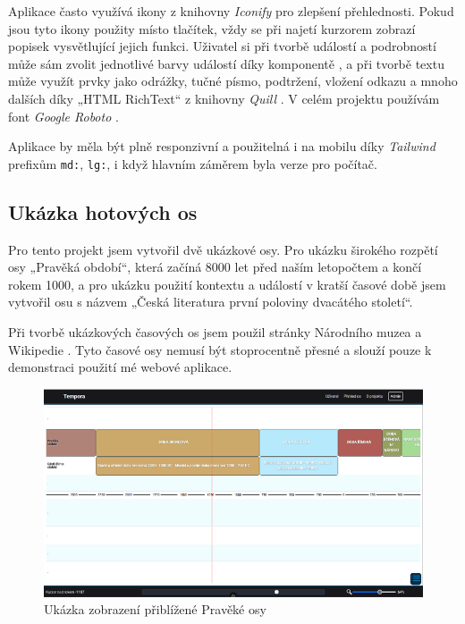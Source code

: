 Aplikace často využívá ikony z knihovny \textit{Iconify} \cite{Icons-pack} pro zlepšení přehlednosti. Pokud jsou tyto ikony použity místo tlačítek, vždy se při najetí kurzorem zobrazí popisek vysvětlující jejich funkci. \newpage Uživatel si při tvorbě událostí a podrobností může sám zvolit jednotlivé barvy událostí díky komponentě \cite{ColorPicker-module}, a při tvorbě textu může využít prvky jako odrážky, tučné písmo, podtržení, vložení odkazu a mnoho dalších díky „HTML RichText“ z knihovny \textit{Quill} \cite{Quill-lib}. V celém projektu používám font \textit{Google Roboto} \cite{Roboto}.

Aplikace by měla být plně responzivní a použitelná i na mobilu díky \textit{Tailwind} prefixům \texttt{md:}, \texttt{lg:}, i když hlavním záměrem byla verze pro počítač.

\subsection{Ukázka hotových os}
Pro tento projekt jsem vytvořil dvě ukázkové osy. Pro ukázku širokého rozpětí osy „Pravěká období“, která začíná 8000 let před naším letopočtem a končí rokem 1000, a pro ukázku použití kontextu a událostí v kratší časové době jsem vytvořil osu s názvem „Česká literatura první poloviny dvacátého století“. 

Při tvorbě ukázkových časových os jsem použil stránky Národního muzea \cite{archeologie-pravek} a Wikipedie \cite{literatura-wiki}. Tyto časové osy nemusí být stoprocentně přesné a slouží pouze k demonstraci použití mé webové aplikace.


\begin{figure}[h]
    \centering
    \includegraphics[width=1\linewidth]{Images/Detail-pravěk.png}
    \caption{Ukázka zobrazení přiblížené Pravěké osy }
    \label{fig:Detail-pravěk}
\end{figure}

